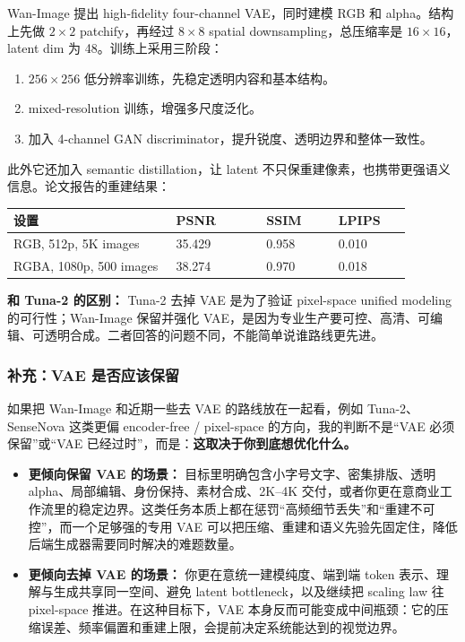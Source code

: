 Wan-Image 提出 high-fidelity four-channel VAE，同时建模 RGB 和 alpha。结构上先做 \(2\times2\) patchify，再经过 \(8\times8\) spatial downsampling，总压缩率是 \(16\times16\)，latent dim 为 48。训练上采用三阶段：

\begin{enumerate}[leftmargin=1.5em]
  \item \(256\times256\) 低分辨率训练，先稳定透明内容和基本结构。
  \item mixed-resolution 训练，增强多尺度泛化。
  \item 加入 4-channel GAN discriminator，提升锐度、透明边界和整体一致性。
\end{enumerate}

此外它还加入 semantic distillation，让 latent 不只保重建像素，也携带更强语义信息。论文报告的重建结果：

\begin{center}
\small
\begin{tabular}{p{0.36\linewidth} p{0.20\linewidth} p{0.16\linewidth} p{0.16\linewidth}}
\toprule
\textbf{设置} & \textbf{PSNR} & \textbf{SSIM} & \textbf{LPIPS}\\
\midrule
RGB, 512p, 5K images & 35.429 & 0.958 & 0.010\\
RGBA, 1080p, 500 images & 38.274 & 0.970 & 0.018\\
\bottomrule
\end{tabular}
\end{center}

\begin{warnbox}
\textbf{和 Tuna-2 的区别：} Tuna-2 去掉 VAE 是为了验证 pixel-space unified modeling 的可行性；Wan-Image 保留并强化 VAE，是因为专业生产要可控、高清、可编辑、可透明合成。二者回答的问题不同，不能简单说谁路线更先进。
\end{warnbox}

\subsubsection{补充：VAE 是否应该保留}

如果把 Wan-Image 和近期一些去 VAE 的路线放在一起看，例如 Tuna-2、SenseNova 这类更偏 encoder-free / pixel-space 的方向，我的判断不是“VAE 必须保留”或“VAE 已经过时”，而是：\textbf{这取决于你到底想优化什么。}

\begin{itemize}[leftmargin=1.5em]
  \item \textbf{更倾向保留 VAE 的场景：} 目标里明确包含小字号文字、密集排版、透明 alpha、局部编辑、身份保持、素材合成、2K--4K 交付，或者你更在意商业工作流里的稳定边界。这类任务本质上都在惩罚“高频细节丢失”和“重建不可控”，而一个足够强的专用 VAE 可以把压缩、重建和语义先验先固定住，降低后端生成器需要同时解决的难题数量。
  \item \textbf{更倾向去掉 VAE 的场景：} 你更在意统一建模纯度、端到端 token 表示、理解与生成共享同一空间、避免 latent bottleneck，以及继续把 scaling law 往 pixel-space 推进。在这种目标下，VAE 本身反而可能变成中间瓶颈：它的压缩误差、频率偏置和重建上限，会提前决定系统能达到的视觉边界。
\end{itemize}

